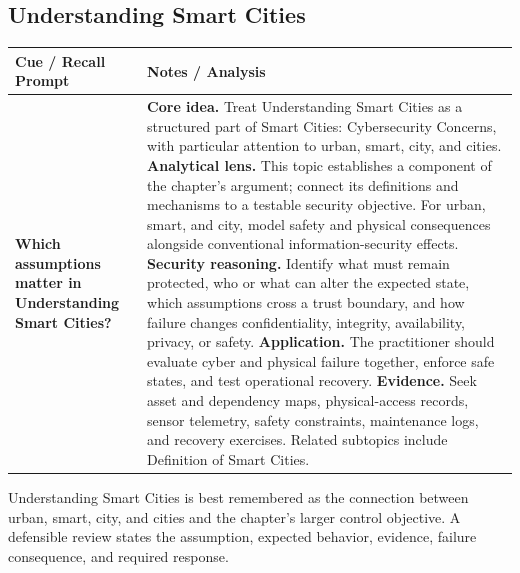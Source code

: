 \documentclass[11pt]{article}
\newcommand{\CornellHeader}{%
\rowcolor{Navy}\color{white}\bfseries Cue / Recall Prompt & \color{white}\bfseries Notes / Analysis\\\hline}
\newcommand{\CornellRow}[2]{%
\cellcolor{CueGray}\RaggedRight\textbf{#1} & \RaggedRight #2\\\hline}
\begin{document}
\subsection*{Understanding Smart Cities}
\begin{longtable}{>{\RaggedRight\arraybackslash}p{}|>{\RaggedRight\arraybackslash}p{}}
\CornellHeader
\CornellRow{Which assumptions matter in Understanding Smart Cities?}{\textbf{Core idea.} Treat Understanding Smart Cities as a structured part of Smart Cities: Cybersecurity Concerns, with particular attention to urban, smart, city, and cities. \textbf{Analytical lens.} This topic establishes a component of the chapter's argument; connect its definitions and mechanisms to a testable security objective. For urban, smart, and city, model safety and physical consequences alongside conventional information-security effects. \textbf{Security reasoning.} Identify what must remain protected, who or what can alter the expected state, which assumptions cross a trust boundary, and how failure changes confidentiality, integrity, availability, privacy, or safety. \textbf{Application.} The practitioner should evaluate cyber and physical failure together, enforce safe states, and test operational recovery. \textbf{Evidence.} Seek asset and dependency maps, physical-access records, sensor telemetry, safety constraints, maintenance logs, and recovery exercises. Related subtopics include Definition of Smart Cities.}
\end{longtable}
\begin{topicsummary}
Understanding Smart Cities is best remembered as the connection between urban, smart, city, and cities and the chapter's larger control objective. A defensible review states the assumption, expected behavior, evidence, failure consequence, and required response.
\end{topicsummary}
\end{document}

